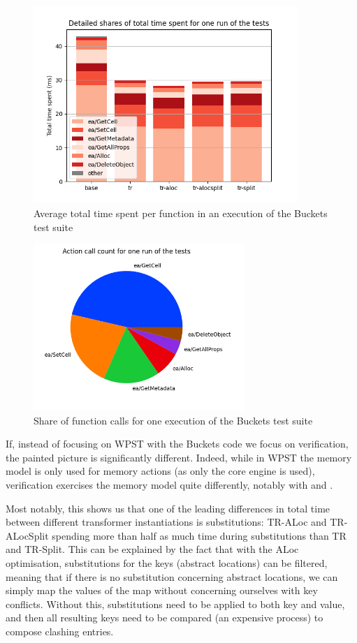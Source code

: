 \begin{figure}
	\centering
	\includegraphics[width=10cm]{figures/js-timespent-buckets.png}
	\caption{Average total time spent per function in an execution of the Buckets test suite}
	\label{fig:js-timespent-buckets}
\end{figure}

\begin{figure}
	\centering
	\includegraphics[width=8cm]{figures/js-callcount-buckets.png}
	\caption{Share of function calls for one execution of the Buckets test suite}
	\label{fig:js-callcount-buckets}
\end{figure}

If, instead of focusing on WPST with the Buckets code we focus on verification, the painted picture is significantly different. Indeed, while in WPST the memory model is only used for memory actions (as only the core engine is used), verification exercises the memory model quite differently, notably with \produce{} and \consume{}.

Most notably, this shows us that one of the leading differences in total time between different transformer instantiations is substitutions: TR-ALoc and TR-ALocSplit spending more than half as much time during substitutions than TR and TR-Split. This can be explained by the fact that with the ALoc optimisation, substitutions for the keys (abstract locations) can be filtered, meaning that if there is no substitution concerning abstract locations, we can simply map the values of the map without concerning ourselves with key conflicts. Without this, substitutions need to be applied to both key and value, and then all resulting keys need to be compared (an expensive process) to compose clashing entries. 

